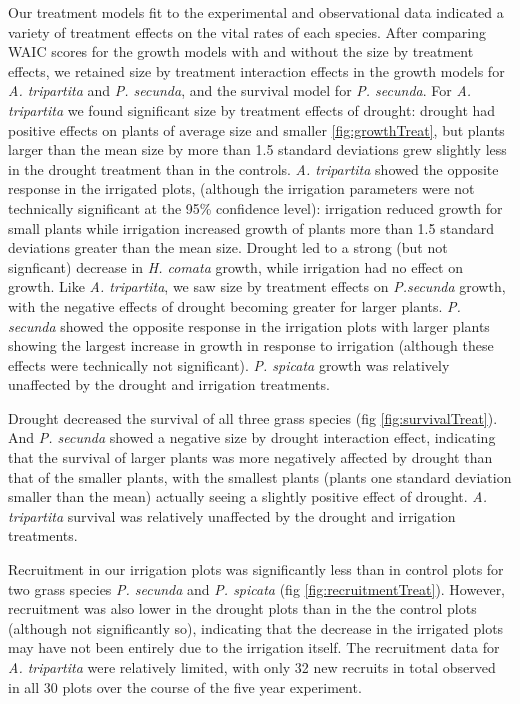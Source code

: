 \documentclass[11pt]{article}
\begin{document}
\begin{doublespacing}
Our treatment models fit to the experimental and observational data indicated a variety of treatment effects on the vital rates of each species. After comparing WAIC scores for the growth models with and without the size by treatment effects, we retained size by treatment interaction effects in the growth models for \textit{A. tripartita} and \textit{P. secunda}, and the survival model for \textit{P. secunda}. For \textit{A. tripartita} we found significant size by treatment effects of drought: drought had positive effects on plants of average size and smaller \ref{fig:growthTreat}, but plants larger than the mean size by more than 1.5 standard deviations grew slightly less in the drought treatment than in the controls. \textit{A. tripartita} showed the opposite response in the irrigated plots, (although the irrigation parameters were not technically significant at the 95\% confidence level): irrigation reduced growth for small plants while irrigation increased growth of plants more than 1.5 standard deviations greater than the mean size. Drought led to a strong (but not signficant) decrease in \textit{H. comata} growth, while irrigation had no effect on growth.  Like \textit{A. tripartita}, we saw size by treatment effects on \textit{P.secunda} growth, with the negative effects of drought becoming greater for larger plants. \textit{P. secunda} showed the opposite response in the irrigation plots with larger plants showing the largest increase in growth in response to irrigation (although these effects were technically not significant). \textit{P. spicata} growth was relatively unaffected by the drought and irrigation treatments. 

Drought decreased the survival of all three grass species (fig \ref{fig:survivalTreat}). And \textit{P. secunda} showed a negative size by drought interaction effect, indicating that the survival of larger plants was more negatively affected by drought than that of the smaller plants, with the smallest plants (plants one standard deviation smaller than the mean) actually seeing a slightly positive effect of drought. \textit{A. tripartita} survival was relatively unaffected by the drought and irrigation treatments.

Recruitment in our irrigation plots was significantly less than in control plots for two grass species \textit{P. secunda} and \textit{P. spicata} (fig \ref{fig:recruitmentTreat}). However, recruitment was also lower in the drought plots than in the the control plots (although not significantly so), indicating that the decrease in the irrigated plots may have not been entirely due to the irrigation itself. The recruitment data for \textit{A. tripartita} were relatively limited, with only 32 new recruits in total observed in all 30 plots over the course of the five year experiment.


\end{doublespacing}
\end{document}

